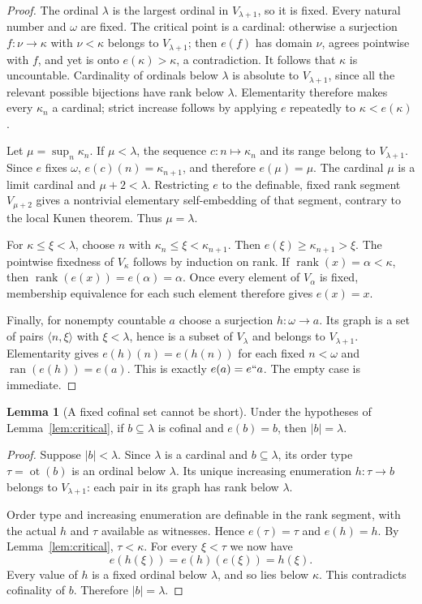 \documentclass[11pt,letterpaper]{article}
\theoremstyle{definition}
\newtheorem{lemma}[definition]{Lemma}
\numberwithin{equation}{section}
\newcommand{\ot}{\operatorname{ot}}
\newcommand{\ran}{\operatorname{ran}}
\newcommand{\rank}{\operatorname{rank}}
\begin{document}
\begin{proof}
The ordinal $\lambda$ is the largest ordinal in $V_{\lambda+1}$, so it is fixed. Every natural number and $\omega$ are fixed. The critical point is a cardinal: otherwise a surjection $f:\nu\to\kappa$ with $\nu<\kappa$ belongs to $V_{\lambda+1}$; then $e(f)$ has domain $\nu$, agrees pointwise with $f$, and yet is onto $e(\kappa)>\kappa$, a contradiction. It follows that $\kappa$ is uncountable. Cardinality of ordinals below $\lambda$ is absolute to $V_{\lambda+1}$, since all the relevant possible bijections have rank below $\lambda$. Elementarity therefore makes every $\kappa_n$ a cardinal; strict increase follows by applying $e$ repeatedly to $\kappa<e(\kappa)$.

Let $\mu=\sup_n\kappa_n$. If $\mu<\lambda$, the sequence $c:n\mapsto\kappa_n$ and its range belong to $V_{\lambda+1}$. Since $e$ fixes $\omega$, $e(c)(n)=\kappa_{n+1}$, and therefore $e(\mu)=\mu$. The cardinal $\mu$ is a limit cardinal and $\mu+2<\lambda$. Restricting $e$ to the definable, fixed rank segment $V_{\mu+2}$ gives a nontrivial elementary self-embedding of that segment, contrary to the local Kunen theorem. Thus $\mu=\lambda$.

For $\kappa\le\xi<\lambda$, choose $n$ with $\kappa_n\le\xi<\kappa_{n+1}$. Then $e(\xi)\ge\kappa_{n+1}>\xi$. The pointwise fixedness of $V_\kappa$ follows by induction on rank. If $\rank(x)=\alpha<\kappa$, then $\rank(e(x))=e(\alpha)=\alpha$. Once every element of $V_\alpha$ is fixed, membership equivalence for each such element therefore gives $e(x)=x$.

Finally, for nonempty countable $a$ choose a surjection $h:\omega\to a$. Its graph is a set of pairs $\langle n,\xi\rangle$ with $\xi<\lambda$, hence is a subset of $V_\lambda$ and belongs to $V_{\lambda+1}$. Elementarity gives $e(h)(n)=e(h(n))$ for each fixed $n<\omega$ and $\ran(e(h))=e(a)$. This is exactly $e(a)=e``a$. The empty case is immediate.
\end{proof}

\begin{lemma}[A fixed cofinal set cannot be short]\label{lem:fixedcofinal}
Under the hypotheses of Lemma~\ref{lem:critical}, if $b\subseteq\lambda$ is cofinal and $e(b)=b$, then $|b|=\lambda$.
\end{lemma}

\begin{proof}
Suppose $|b|<\lambda$. Since $\lambda$ is a cardinal and $b\subseteq\lambda$, its order type $\tau=\ot(b)$ is an ordinal below $\lambda$. Its unique increasing enumeration $h:\tau\to b$ belongs to $V_{\lambda+1}$: each pair in its graph has rank below $\lambda$.

Order type and increasing enumeration are definable in the rank segment, with the actual $h$ and $\tau$ available as witnesses. Hence $e(\tau)=\tau$ and $e(h)=h$. By Lemma~\ref{lem:critical}, $\tau<\kappa$. For every $\xi<\tau$ we now have
\[
 e(h(\xi))=e(h)(e(\xi))=h(\xi).
\]
Every value of $h$ is a fixed ordinal below $\lambda$, and so lies below $\kappa$. This contradicts cofinality of $b$. Therefore $|b|=\lambda$.
\end{proof}
\end{document}

